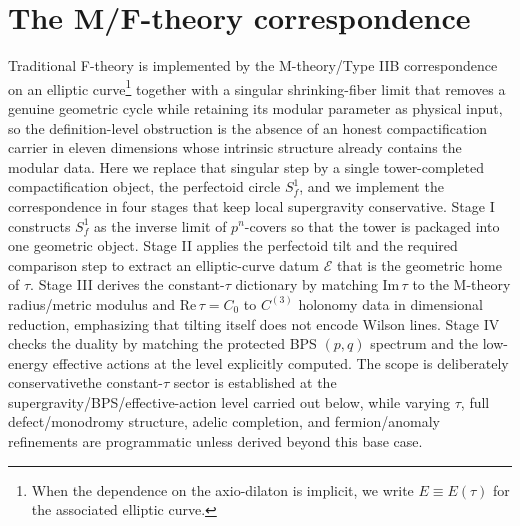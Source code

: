 \documentclass[11pt]{article}
\theoremstyle{remark}
\newcommand{\calE}{\mathcal{E}}
\begin{document}
\section{The M/F-theory correspondence}\label{sec:construct}

Traditional F-theory is implemented by the M-theory/Type IIB correspondence on an elliptic curve\footnote{When the dependence on the axio-dilaton is implicit, we write $E \equiv E(\tau)$ for the associated elliptic curve.
} together with a singular shrinking-fiber limit that removes a genuine geometric cycle while retaining its modular parameter as physical input, so the definition-level obstruction is the absence of an honest compactification carrier in eleven dimensions whose intrinsic structure already contains the modular data. Here we replace that singular step by a single tower-completed compactification object, the perfectoid circle \(S_f^1\), and we implement the correspondence in four stages that keep local supergravity conservative. Stage I constructs \(S_f^1\) as the inverse limit of \(p^n\)-covers so that the tower is packaged into one geometric object. Stage II applies the perfectoid tilt and the required comparison step to extract an elliptic-curve datum \(\calE\) that is the geometric home of \(\tau\). Stage III derives the constant-\(\tau\) dictionary by matching \(\mathrm{Im}\,\tau\) to the M-theory radius/metric modulus and \(\mathrm{Re}\,\tau=C_0\) to \(C^{(3)}\) holonomy data in dimensional reduction, emphasizing that tilting itself does not encode Wilson lines. Stage IV checks the duality by matching the protected BPS \((p,q)\) spectrum and the low-energy effective actions at the level explicitly computed. The scope is deliberately conservative\:the constant-\(\tau\) sector is established at the supergravity/BPS/effective-action level carried out below, while varying \(\tau\), full defect/monodromy structure, adelic completion, and fermion/anomaly refinements are programmatic unless derived beyond this base case.
\end{document}
